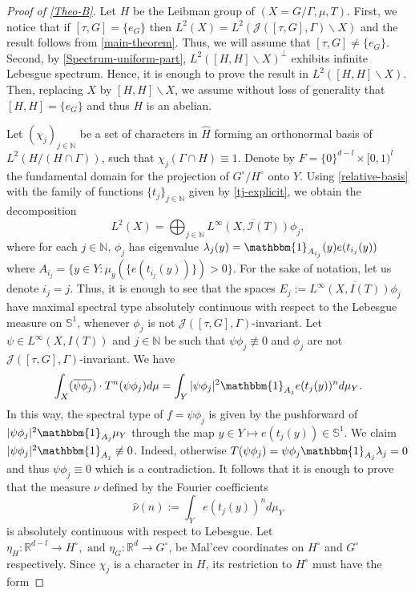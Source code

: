 \documentclass[letter, 11pt]{article}
\theoremstyle{definition}
\theoremstyle{plain}
\newcommand{\N}{\mathbb{N}}
\newcommand{\R}{\mathbb{R}}
\newcommand{\bS}{\mathbb{S}}
\newcommand{\ind}[1]{\mathbbm{1}_{#1}}
\newcommand{\1}{\mathbbm{1}}
\begin{document}
\begin{proof}[Proof of \cref{Theo-B}]
Let $H$ be the Leibman group of $(X=G/\Gamma,\mu,T)$. First, we notice that if $[\tau,G]=\{e_G\}$ then $L^2(X)=L^2(\mathcal{J}([\tau,G],\Gamma)\backslash X)$ and the result follows from \cref{main-theorem}. Thus, we will assume that $[\tau,G]\neq \{e_G\}$. Second, by \cref{Spectrum-uniform-part}, $L^2([H,H]\backslash X)^\perp$ exhibits infinite Lebesgue spectrum. Hence, it is enough to prove the result in $L^2([H,H]\backslash X)$. Then, replacing $X$ by $[H,H]\backslash X$, we assume without loss of generality that $[H,H]=\{e_G\}$ and thus $H$ is an abelian.


Let $(\chi_j)_{j\in \N}$ be a set of characters in $\widehat{H}$ forming an orthonormal basis of $L^2(H/(H\cap \Gamma))$, such that $\chi_j(\Gamma\cap H)\equiv 1$. Denote by $F= \{0\}^{d-l} \times [0,1)^l$ the fundamental domain for the projection of $G^\circ/H^\circ$ onto $Y$. Using  \cref{relative-basis}  with the family of functions $\{t_j\}_{j\in \N}$ given by \cref{tj-explicit}, we obtain the decomposition
    $$L^2(X)= \bigoplus_{j\in \N} \overline{L^{\infty}(X,\mathcal{I}(T)) \phi_j  }, $$
    where for each $j\in \N$, $\phi_j$ has eigenvalue $\lambda_j(y)=  \ind{A_{i_j}}(y) e(t_{i_j}(y))$ where $A_{i_j}=\{y \in Y : \mu_y(\{e(t_{i_j}(y))\})>0 \}.$ For the sake of notation, let us denote $i_j=j$. Thus, it is enough to see that the spaces $E_j:=  \overline{ L^\infty(X,I(T))  \phi_j} $ have maximal spectral type absolutely continuous with respect to the Lebesgue measure on $\bS^1$, whenever $\phi_j$ is not $\mathcal{J}([\tau,G],\Gamma)$-invariant. Let $\psi \in L^\infty(X,I(T))$ and $j \in \N$ be such that $\psi\phi_j\not\equiv 0$ and $\phi_j$ are not $\mathcal{J}([\tau,G],\Gamma)$-invariant. We have 
$$\int_X (\overline{\psi\phi_j})\cdot T^n(\psi\phi_j) d\mu=\int_Y |\psi \phi_j|^2 \ind{A_j} e(t_j(y))^nd\mu_Y. $$
In this way, the spectral type of $f= \psi\phi_j$ is given by the pushforward of $|\psi \phi_j|^2\ind{A_j}\mu_Y  $  through the map $y\in Y \mapsto e(t_j(y))\in \bS^1$. We claim $|\psi \phi_j|^2 \ind{A_j}\not\equiv 0$. Indeed, otherwise $T(\psi\phi_j)= \psi \phi_j \ind{A_j} \lambda_j=0$ and thus $\psi\phi_j\equiv 0$ which is a contradiction. It follows that it is enough to prove that the measure $\nu$ defined by the Fourier coefficients
$$\hat{\nu}(n):=\int_Y e(t_j(y))^n d\mu_Y  $$
is absolutely continuous with respect to Lebesgue. Let $\eta_{H}:\R^{d-l}\to H^\circ, \text{ and }\eta_{G}: \R^d \to G^\circ$, be Mal'cev coordinates on $H^\circ$ and $G^\circ$ respectively. Since $\chi_j$ is a character in $H$, its restriction to $H^\circ$ must have the form

\end{proof}
\end{document}
